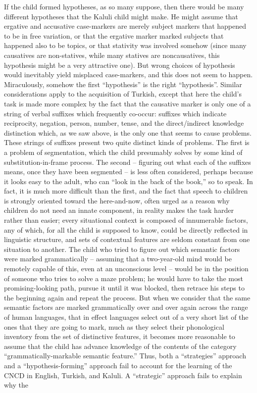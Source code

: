 If the child formed hypotheses, as so many suppose, then there would be many different hypotheses that the Kaluli child might make. He might assume that ergative and accusative case-markers are merely subject markers that happened to be in free variation, or that the ergative marker marked subjects that happened also to be topics, or that stativity was involved somehow (since many causatives are non-statives, while many statives are noncausatives, this hypothesis might be a very attractive one). But wrong choices of hypothesis would inevitably yield misplaced case-markers, and this does not seem to happen. Miraculously, somehow the first ``hypothesis'' is the right ``hypothesis''. Similar considerations apply to the acquisition of Turkish, except
that here the child's task is made more complex by the fact that the causative marker is only one of a string of verbal suffixes which frequently co-occur: suffixes which indicate reciprocity, negation, person, number, tense, and the direct/indirect knowledge distinction which, as we saw above, is the only one that seems to cause problems. These strings of suffixes present two quite distinct kinds of problems. The first is a problem of segmentation, which the child presumably solves by some kind of substitution-in-frame process. The second -- figuring out what each of the suffixes means, once they have been segmented -- is less often considered, perhaps because it looks easy to the adult, who can ``look in the back of the book,'' so to speak. In fact, it is much more difficult than the first, and the fact that speech to children is strongly oriented toward the here-and-now, often urged as a reason why children do not need an innate component, in reality makes the task harder rather than easier; every situational context is composed of innumerable factors, any of which, for all the child is supposed to know, could be directly reflected in linguistic structure, and sets of contextual features are seldom constant from one situation to another. The child who tried to figure out which semantic factors were marked grammatically -- assuming that a two-year-old mind would be remotely capable of this, even at an unconscious level -- would be in the position of someone who tries to solve a maze problem; he would have to take the most promising-looking path, pursue it until it was blocked, then retrace his steps to the beginning again and repeat the process. But when we consider that the same semantic factors are marked grammatically over and over again across the range of human languages, that in effect languages select out of a very short list of  the ones that they are going to mark, much as they select their phonological inventory from the set of distinctive features, it becomes more reasonable to assume that the child has advance knowledge of the contents of the category ``grammatically-markable semantic feature.'' Thus, both a ``strategies'' approach and a ``hypothesis-forming'' approach fail to account for the learning of the CNCD in English, Turkish, and Kaluli. A ``strategic'' approach fails to explain why the
